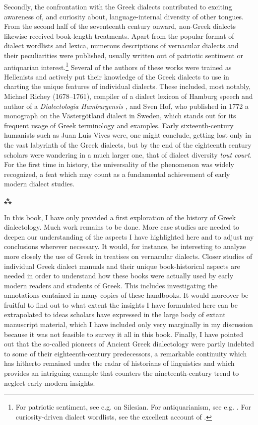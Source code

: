 Secondly, the confrontation with the Greek dialects contributed to exciting awareness of, and curiosity about, language-internal diversity of other tongues. From the second half of the seventeenth century onward, non-Greek dialects likewise received book-length treatments. Apart from the popular format of dialect wordlists and lexica, numerous descriptions of vernacular dialects and their peculiarities were published, usually written out of patriotic sentiment or antiquarian interest.\footnote{For patriotic sentiment, see e.g. \citet{Meisner1705} on Silesian. For antiquarianism, see e.g. \citet{Oberlin1775}. For curiosity-driven dialect wordlists, see the excellent account of \citet{Considine2017}.} Several of the authors of these works were trained as Hellenists and actively put their knowledge of the Greek dialects to use in charting the unique features of individual dialects. These included, most notably, Michael Richey (1678–1761), compiler of a dialect lexicon of Hamburg speech \citep{Richey1743} and author of a \textit{Dialectologia Hamburgensis} \citep{Richey1755}, and Sven Hof, who published in 1772 a monograph on the Västergötland dialect in Sweden, which stands out for its frequent usage of Greek terminology and examples. Early sixteenth-century humanists such as Juan Luis Vives were, one might conclude, getting lost only in the vast labyrinth of the Greek dialects, but by the end of the eighteenth century scholars were wandering in a much larger one, that of dialect diversity \textit{tout court}. For the first time in history, the universality of the phenomenon was widely recognized, a feat which may count as a fundamental achievement of early modern dialect studies.

\begin{center}
\large⁂
\end{center}

\noindent In this book, I have only provided a first exploration of the history of Greek dialectology. Much work remains to be done. More case studies are needed to deepen our understanding of the aspects I have highlighted here and to adjust my conclusions wherever necessary. It would, for instance, be interesting to analyze more closely the use of Greek in treatises on vernacular dialects. Closer studies of individual Greek dialect manuals and their unique book-historical aspects are needed in order to understand how these books were actually used by early modern readers and students of Greek. This includes investigating the annotations contained in many copies of these handbooks. It would moreover be fruitful to find out to what extent the insights I have formulated here can be extrapolated to ideas scholars have expressed in the large body of extant manuscript material, which I have included only very marginally in my discussion because it was not feasible to survey it all in this book. Finally, I have pointed out that the so-called pioneers of Ancient Greek dialectology were partly indebted to some of their eighteenth-century predecessors, a remarkable continuity which has hitherto remained under the radar of historians of linguistics and which provides an intriguing example that counters the nineteenth-century trend to neglect early modern insights.


